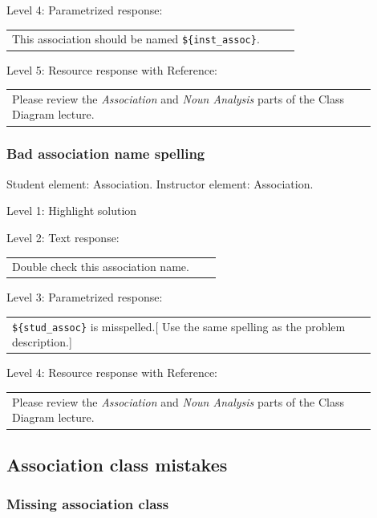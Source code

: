 \noindent Level 4: Parametrized response: \medskip

\begin{tabular}{|p{0.9\linewidth}}
This association should be named \verb|${inst_assoc}|.
\end{tabular} \medskip

\noindent Level 5: Resource response with Reference: \medskip

\begin{tabular}{|p{0.9\linewidth}}
Please review the \textit{Association} and \textit{Noun Analysis} parts of the Class Diagram lecture.
\end{tabular} \medskip


\subsubsection{Bad association name spelling}

Student element: Association. Instructor element: Association. \medskip

\noindent Level 1: Highlight solution  \medskip

\noindent Level 2: Text response: \medskip

\begin{tabular}{|p{0.9\linewidth}}
Double check this association name.
\end{tabular} \medskip

\noindent Level 3: Parametrized response: \medskip

\begin{tabular}{|p{0.9\linewidth}}
\verb|${stud_assoc}| is misspelled.[ Use the same spelling as the problem description.]
\end{tabular} \medskip

\noindent Level 4: Resource response with Reference: \medskip

\begin{tabular}{|p{0.9\linewidth}}
Please review the \textit{Association} and \textit{Noun Analysis} parts of the Class Diagram lecture.
\end{tabular} \medskip


\subsection{Association class mistakes}

\subsubsection{Missing association class}

